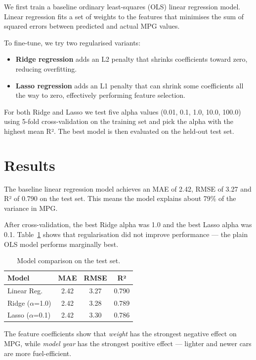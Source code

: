\documentclass[a4paper, twocolumn]{article}
\begin{document}
We first train a baseline ordinary least-squares (OLS) linear regression model. Linear regression fits a set of weights to the features that minimises the sum of squared errors between predicted and actual MPG values.

To fine-tune, we try two regularised variants:
\begin{itemize}
    \item \textbf{Ridge regression} adds an L2 penalty that shrinks coefficients toward zero, reducing overfitting.
    \item \textbf{Lasso regression} adds an L1 penalty that can shrink some coefficients all the way to zero, effectively performing feature selection.
\end{itemize}

For both Ridge and Lasso we test five alpha values (0.01, 0.1, 1.0, 10.0, 100.0) using 5-fold cross-validation on the training set and pick the alpha with the highest mean R². The best model is then evaluated on the held-out test set.

\section{Results}

The baseline linear regression model achieves an MAE of 2.42, RMSE of 3.27 and R² of 0.790 on the test set. This means the model explains about 79\% of the variance in MPG.

After cross-validation, the best Ridge alpha was 1.0 and the best Lasso alpha was 0.1. Table~\ref{tab:comparison} shows that regularisation did not improve performance — the plain OLS model performs marginally best.

\begin{table}[h]
\centering
\small
\begin{tabular}{lccc}
\hline
\textbf{Model} & \textbf{MAE} & \textbf{RMSE} & \textbf{R²} \\
\hline
Linear Reg. & 2.42 & 3.27 & 0.790 \\
Ridge ($\alpha$=1.0) & 2.42 & 3.28 & 0.789 \\
Lasso ($\alpha$=0.1) & 2.42 & 3.30 & 0.786 \\
\hline
\end{tabular}
\caption{Model comparison on the test set.}
\label{tab:comparison}
\end{table}

The feature coefficients show that \textit{weight} has the strongest negative effect on MPG, while \textit{model year} has the strongest positive effect — lighter and newer cars are more fuel-efficient.
\end{document}
